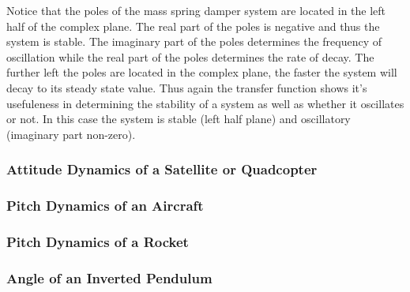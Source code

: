 Notice that the poles of the mass spring damper system are located in the left half of the complex plane. The real part of the poles is negative and thus the system is stable. The imaginary part of the poles determines the frequency of oscillation while the real part of the poles determines the rate of decay. The further left the poles are located in the complex plane, the faster the system will decay to its steady state value. Thus again the transfer function shows it's usefuleness in determining the stability of a system as well as whether it oscillates or not. In this case the system is stable (left half plane) and oscillatory (imaginary part non-zero).

\subsubsection{Attitude Dynamics of a Satellite or Quadcopter}

\subsubsection{Pitch Dynamics of an Aircraft}

\subsubsection{Pitch Dynamics of a Rocket}

\subsubsection{Angle of an Inverted Pendulum}
